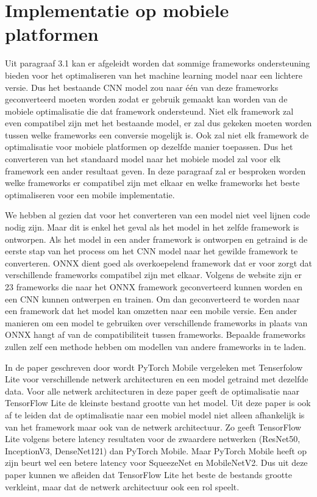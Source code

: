 \section{Implementatie op mobiele platformen}
Uit paragraaf 3.1 kan er afgeleidt worden dat sommige frameworks ondersteuning bieden voor het optimaliseren van het machine learning model naar een lichtere versie.
Dus het bestaande CNN model zou naar \'e\'en van deze frameworks geconverteerd moeten worden zodat er gebruik gemaakt kan worden van de mobiele optimalisatie die dat framework ondersteund.
Niet elk framework zal even compatibel zijn met het bestaande model, er zal dus gekeken moeten worden tussen welke frameworks een conversie mogelijk is.
Ook zal niet elk framework de optimalisatie voor mobiele platformen op dezelfde manier toepassen.
Dus het converteren van het standaard model naar het mobiele model zal voor elk framework een ander resultaat geven.
In deze paragraaf zal er besproken worden welke frameworks er compatibel zijn met elkaar en welke frameworks het beste optimaliseren voor een mobile implementatie.

We hebben al gezien dat voor het converteren van een model niet veel lijnen code nodig zijn. 
Maar dit is enkel het geval als het model in het zelfde framework is ontworpen.
Als het model in een ander framework is ontworpen en getraind is de eerste stap van het process om het CNN model naar het gewilde framework te converteren.
ONNX dient goed als overkoepelend framework dat er voor zorgt dat verschillende frameworks compatibel zijn met elkaar.
Volgens de website zijn er 23 frameworks die naar het ONNX framework geconverteerd kunnen worden en een CNN kunnen ontwerpen en trainen. 
Om dan geconverteerd te worden naar een framework dat het model kan omzetten naar een mobile versie.
Een ander manieren om een model te gebruiken over verschillende frameworks in plaats van ONNX hangt af van de compatibiliteit tussen frameworks.
Bepaalde frameworks zullen zelf een methode hebben om modellen van andere frameworks in te laden.

In de paper geschreven door \cite{luo_comparison_2020} wordt PyTorch Mobile vergeleken met Tenserfolow Lite voor verschillende netwerk architecturen en een model getraind met dezelfde data.
Voor alle netwerk architecturen in deze paper geeft de optimalisatie naar TensorFlow Lite de kleinste bestand grootte van het model. 
Uit deze paper is ook af te leiden dat de optimalisatie naar een mobiel model niet alleen afhankelijk is van het framework maar ook van de netwerk architectuur.
Zo geeft TensorFlow Lite volgens \cite{luo_comparison_2020} betere latency resultaten voor de zwaardere netwerken (ResNet50, InceptionV3, DenseNet121) dan PyTorch Mobile.
Maar PyTorch Mobile heeft op zijn beurt wel een betere latency voor SqueezeNet en MobileNetV2.
Dus uit deze paper kunnen we afleiden dat TensorFlow Lite het beste de bestands grootte verkleint, maar dat de netwerk architectuur ook een rol speelt.

